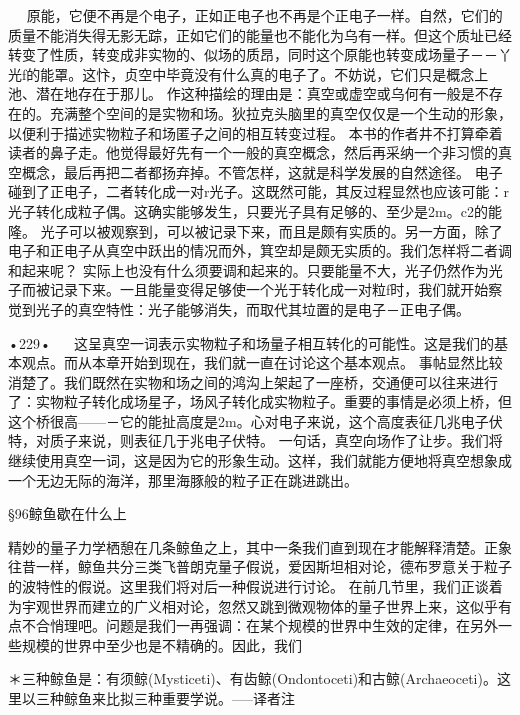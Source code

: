   
原能，它便不再是个电子，正如正电子也不再是个正电子一样。自然，它们的质量不能消失得无影无踪，正如它们的能量也不能化为乌有一样。但这个质址已经转变了性质，转变成非实物的、似场的质昂，同时这个原能也转变成场量子－－丫光f的能罩。这忭，贞空中毕竟没有什么真的电子了。不妨说，它们只是概念上池、潜在地存在于那儿。
作这种描绘的理由是：真空或虚空或乌何有一般是不存在的。充满整个空间的是实物和场。狄拉克头脑里的真空仅仅是一个生动的形象，以便利于描述实物粒子和场匿子之间的相互转变过程。
本书的作者井不打算牵着读者的鼻子走。他觉得最好先有一个一般的真空概念，然后再采纳一个非习惯的真空概念，最后再把二者都扬弃掉。不管怎样，这就是科学发展的自然途径。
电子碰到了正电子，二者转化成一对r光子。这既然可能，其反过程显然也应该可能：r光子转化成粒子偶。这确实能够发生，只要光子具有足够的、至少是2m。c2的能隆。
光子可以被观察到，可以被记录下来，而且是颇有实质的。另一方面，除了电子和正电子从真空中跃出的情况而外，箕空却是颇无实质的。我们怎样将二者调和起来呢？
实际上也没有什么须要调和起来的。只要能量不大，光子仍然作为光子而被记录下来。一且能量变得足够使一个光于转化成一对粒f时，我们就开始察觉到光子的真空特性：光子能够消失，而取代其垃置的是电子－正电子偶。

•229•
  
这呈真空一词表示实物粒子和场量子相互转化的可能性。这是我们的基本观点。而从本章开始到现在，我们就一直在讨论这个基本观点。
事帖显然比较消楚了。我们既然在实物和场之间的鸿沟上架起了一座桥，交通便可以往来进行了：实物粒子转化成场星子，场风子转化成实物粒子。重要的事情是必须上桥，但这个桥很高——－它的能扯高度是2m。心对电子来说，这个高度表征几兆电子伏特，对质子来说，则表征几于兆电子伏特。
一句话，真空向场作了让步。我们将继续使用真空一词，这是因为它的形象生动。这样，我们就能方便地将真空想象成一个无边无际的海洋，那里海豚般的粒子正在跳进跳出。

§96鲸鱼歇在什么上

精妙的量子力学栖憩在几条鲸鱼之上，其中一条我们直到现在才能解释清楚。正象往昔一样，鲸鱼共分三类飞普朗克量子假说，爱因斯坦相对论，德布罗意关于粒子的波特性的假说。这里我们将对后一种假说进行讨论。
在前几节里，我们正谈着为宇观世界而建立的广义相对论，忽然又跳到微观物体的量子世界上来，这似乎有点不合悄理吧。问题是我们一再强调：在某个规模的世界中生效的定律，在另外一些规模的世界中至少也是不精确的。因此，我们

＊三种鲸鱼是：有须鲸(Mysticeti)、有齿鲸(Ondontoceti)和古鲸(Archaeoceti)。这里以三种鲸鱼来比拟三种重要学说。—--译者注

